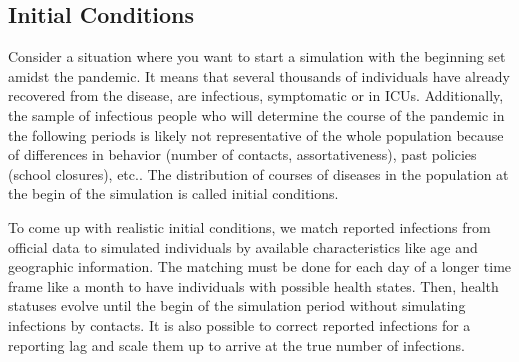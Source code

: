 \subsection{Initial Conditions} %
\label{sub:initial_conditions}

Consider a situation where you want to start a simulation with the beginning set amidst
the pandemic. It means that several thousands of individuals have already recovered from
the disease, are infectious, symptomatic or in ICUs. Additionally, the sample of
infectious people who will determine the course of the pandemic in the following periods
is likely not representative of the whole population because of differences in behavior
(number of contacts, assortativeness), past policies (school closures), etc.. The
distribution of courses of diseases in the population at the begin of the simulation is
called initial conditions.

To come up with realistic initial conditions, we match reported infections from official
data to simulated individuals by available characteristics like age and geographic
information. The matching must be done for each day of a longer time frame like a month
to have individuals with possible health states. Then, health statuses evolve until the
begin of the simulation period without simulating infections by contacts. It is also
possible to correct reported infections for a reporting lag and scale them up to arrive
at the true number of infections.

